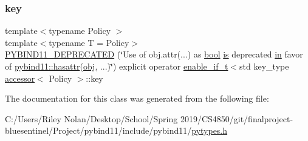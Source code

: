 \subsubsection{\texorpdfstring{key}{key}}
{\footnotesize\ttfamily template$<$typename Policy $>$ \\
template$<$typename T  = Policy$>$ \\
\mbox{\hyperlink{classobject__api_a805215f1a7d50f7fb6a6ffb723707c73}{P\+Y\+B\+I\+N\+D11\+\_\+\+D\+E\+P\+R\+E\+C\+A\+T\+ED}} (\char`\"{}Use of obj.\+attr(...) as \mbox{\hyperlink{asdl_8h_af6a258d8f3ee5206d682d799316314b1}{bool}} \mbox{\hyperlink{classobject__api_a63b93f9f16e8e08c9672fe553c054885}{is}} deprecated \mbox{\hyperlink{_s_d_l__opengl__glext_8h_a83ad0ee7f1e06b59c90271716e689080}{in}} favor of \mbox{\hyperlink{group__python__builtins_gaec38f84a4416ddc3b311ecdbff659ed7}{pybind11\+::hasattr}}(\mbox{\hyperlink{_s_d_l__opengl__glext_8h_a0c0d4701a6c89f4f7f0640715d27ab26}{obj}}, ...)\char`\"{}) explicit operator \mbox{\hyperlink{detail_2common_8h_a012819c9e8b5e04872a271f50f8b8196}{enable\+\_\+if\+\_\+t}}$<$std key\+\_\+type \mbox{\hyperlink{classaccessor}{accessor}}$<$ Policy $>$\+::key}



The documentation for this class was generated from the following file\+:\begin{DoxyCompactItemize}
\item 
C\+:/\+Users/\+Riley Nolan/\+Desktop/\+School/\+Spring 2019/\+C\+S4850/git/finalproject-\/bluesentinel/\+Project/pybind11/include/pybind11/\mbox{\hyperlink{pytypes_8h}{pytypes.\+h}}\end{DoxyCompactItemize}
